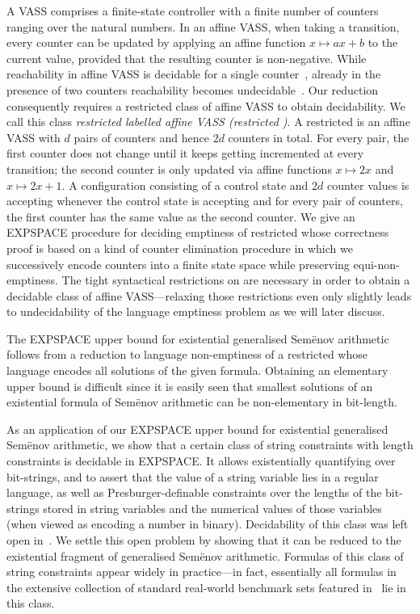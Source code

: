 A VASS comprises a finite-state controller with a finite number of
counters ranging over the natural numbers. In an affine VASS, when
taking a transition, every counter can be updated by applying an
affine function $x \mapsto a x + b$ to the current value,
provided that the resulting counter is non-negative. While
reachability in affine VASS is decidable for a single
counter~\cite{FGH13}, already in the presence of two counters
reachability becomes undecidable~\cite{Reichert2015}. Our reduction
consequently requires a restricted class of affine VASS to obtain
decidability. We call this class
\emph{restricted labelled affine VASS (restricted \laVASS)}. A
restricted \laVASS is an affine VASS with $d$ pairs of counters and
hence $2d$ counters in total. For every pair, the first counter does
not change until it keeps getting incremented at every transition; the
second counter is only updated via affine functions $x\mapsto 2
x$ and $x\mapsto 2 x+1$. A configuration consisting of a control
state and $2d$ counter values is accepting whenever the control state
is accepting and for every pair of counters, the first counter has the
same value as the second counter. We give an EXPSPACE procedure for
deciding emptiness of restricted \laVASS whose correctness proof is
based on a kind of counter elimination procedure in which we
successively encode counters into a finite state space while
preserving equi-non-emptiness. The tight syntactical restrictions
on \laVASS are necessary in order to obtain a decidable class of
affine VASS---relaxing those restrictions even only slightly leads to
undecidability of the language emptiness problem as we will later
discuss.

The EXPSPACE upper bound for existential generalised Sem{\"e}nov
arithmetic follows from a reduction to language non-emptiness of a
restricted \laVASS whose language encodes all solutions of the given
formula. Obtaining an elementary upper bound is difficult since it is
easily seen that smallest solutions of an existential formula of
Sem{\"e}nov arithmetic can be non-elementary in bit-length.

As an application of our EXPSPACE upper bound for existential
generalised Sem{\"e}nov arithmetic, we show that a certain class of
string constraints with length constraints is decidable in
EXPSPACE. It allows existentially quantifying over bit-strings, and to
assert that the value of a string variable lies in a regular language,
as well as Presburger-definable constraints over the lengths of the
bit-strings stored in string variables and the numerical values of
those variables (when viewed as encoding a number in binary).
Decidability of this class was left open in~\cite{BDGKMMN23}. We
settle this open problem by showing that it can be reduced to the
existential fragment of generalised Sem{\"e}nov arithmetic. Formulas
of this class of string constraints appear widely in practice---in
fact, essentially all formulas in the extensive collection of standard
real-world benchmark sets featured in~\cite{BDGKMMN23,BKMMDNG20} lie
in this class.
